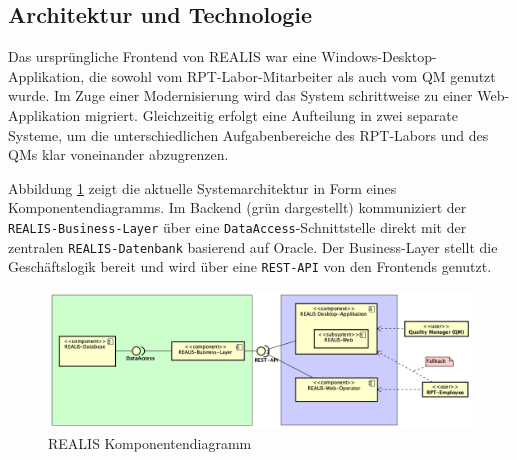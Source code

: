 \subsection{Architektur und Technologie}
Das ursprüngliche Frontend von REALIS war eine Windows-Desktop-Applikation, die sowohl vom \ac{RPT}-Labor-Mitarbeiter als auch vom \ac{QM} genutzt wurde. Im Zuge einer Modernisierung wird das System schrittweise zu einer Web-Applikation migriert. Gleichzeitig erfolgt eine Aufteilung in zwei separate Systeme, um die unterschiedlichen Aufgabenbereiche des RPT-Labors und des \acp{QM} klar voneinander abzugrenzen.

Abbildung \ref{fig:realis-komponentendiagramm} zeigt die aktuelle Systemarchitektur in Form eines Komponentendiagramms. Im Backend (grün dargestellt) kommuniziert der \texttt{REALIS-Business-Layer} über eine \texttt{DataAccess}-Schnittstelle direkt mit der zentralen \texttt{REALIS-Datenbank} basierend auf Oracle. Der Business-Layer stellt die Geschäftslogik bereit und wird über eine \texttt{REST-API} von den Frontends genutzt.

\begin{figure}[!h]
    \centering
    \includegraphics[width=1\textwidth]{bilder/REALIS-Komponentendiagramm.png}
    \caption{REALIS Komponentendiagramm}
    \label{fig:realis-komponentendiagramm}
\end{figure}

